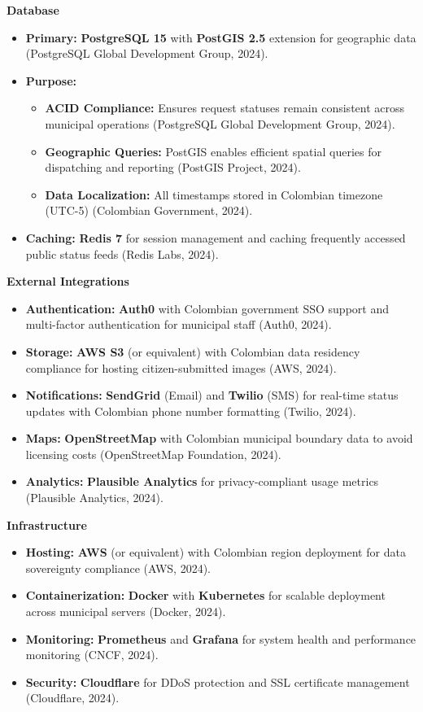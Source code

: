 \documentclass[12pt,a4paper]{article}
\begin{document}
\textbf{Database}

\begin{itemize}
    \item \textbf{Primary:} \textbf{PostgreSQL 15} with \textbf{PostGIS 2.5} extension for geographic data (PostgreSQL Global Development Group, 2024).
    \item \textbf{Purpose:} 
    \begin{itemize}
        \item \textbf{ACID Compliance:} Ensures request statuses remain consistent across municipal operations (PostgreSQL Global Development Group, 2024).
        \item \textbf{Geographic Queries:} PostGIS enables efficient spatial queries for dispatching and reporting (PostGIS Project, 2024).
        \item \textbf{Data Localization:} All timestamps stored in Colombian timezone (UTC-5) (Colombian Government, 2024).
    \end{itemize}
    \item \textbf{Caching:} \textbf{Redis 7} for session management and caching frequently accessed public status feeds (Redis Labs, 2024).
\end{itemize}

\textbf{External Integrations}

\begin{itemize}
    \item \textbf{Authentication:} \textbf{Auth0} with Colombian government SSO support and multi-factor authentication for municipal staff (Auth0, 2024).
    \item \textbf{Storage:} \textbf{AWS S3} (or equivalent) with Colombian data residency compliance for hosting citizen-submitted images (AWS, 2024).
    \item \textbf{Notifications:} \textbf{SendGrid} (Email) and \textbf{Twilio} (SMS) for real-time status updates with Colombian phone number formatting (Twilio, 2024).
    \item \textbf{Maps:} \textbf{OpenStreetMap} with Colombian municipal boundary data to avoid licensing costs (OpenStreetMap Foundation, 2024).
    \item \textbf{Analytics:} \textbf{Plausible Analytics} for privacy-compliant usage metrics (Plausible Analytics, 2024).
\end{itemize}

\textbf{Infrastructure}

\begin{itemize}
    \item \textbf{Hosting:} \textbf{AWS} (or equivalent) with Colombian region deployment for data sovereignty compliance (AWS, 2024).
    \item \textbf{Containerization:} \textbf{Docker} with \textbf{Kubernetes} for scalable deployment across municipal servers (Docker, 2024).
    \item \textbf{Monitoring:} \textbf{Prometheus} and \textbf{Grafana} for system health and performance monitoring (CNCF, 2024).
    \item \textbf{Security:} \textbf{Cloudflare} for DDoS protection and SSL certificate management (Cloudflare, 2024).
\end{itemize}
\end{document}
